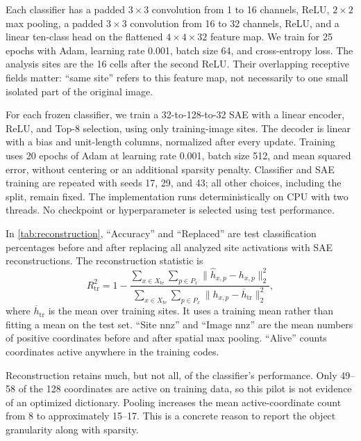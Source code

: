Each classifier has a padded $3\times3$ convolution from 1 to 16
channels, ReLU, $2\times2$ max pooling, a padded $3\times3$ convolution
from 16 to 32 channels, ReLU, and a linear ten-class head on the flattened
$4\times4\times32$ feature map. We train for 25 epochs with Adam,
learning rate 0.001, batch size 64, and cross-entropy loss. The analysis
sites are the 16 cells after the second ReLU. Their overlapping receptive
fields matter: ``same site'' refers to this feature map, not necessarily
to one small isolated part of the original image.

For each frozen classifier, we train a 32-to-128-to-32 SAE with a linear
encoder, ReLU, and Top-8 selection, using only training-image sites.
The decoder is linear with a bias and unit-length columns, normalized
after every update. Training uses 20 epochs of Adam at learning rate
0.001, batch size 512, and mean squared error, without centering or an
additional sparsity penalty. Classifier and SAE training are repeated
with seeds 17, 29, and 43; all other choices, including the split, remain
fixed. The implementation runs deterministically on CPU with two threads.
No checkpoint or hyperparameter is selected using test performance.



In \cref{tab:reconstruction}, ``Accuracy'' and ``Replaced'' are test
classification percentages before and after replacing all analyzed site
activations with SAE reconstructions. The reconstruction statistic is
\begin{equation}\label{eq:reconstruction-statistic}
      R^{2}_{\mathrm{tr}}=1-
      \frac{\sum_{x\in X_{\mathrm{te}}}\sum_{p\in P_{x}}
            \|\widehat h_{x,p}-h_{x,p}\|_{2}^{2}}
      {\sum_{x\in X_{\mathrm{te}}}\sum_{p\in P_{x}}
            \|h_{x,p}-\overline h_{\mathrm{tr}}\|_{2}^{2}},
\end{equation}
where $\overline h_{\mathrm{tr}}$ is the mean over training sites.
It uses a training mean rather than fitting a mean on the test set.
``Site nnz'' and ``Image nnz'' are the mean numbers of positive
coordinates before and after spatial max pooling. ``Alive'' counts
coordinates active anywhere in the training codes.

Reconstruction retains much, but not all, of the classifier's performance.
Only 49--58 of the 128 coordinates are active on training data, so this
pilot is not evidence of an optimized dictionary. Pooling increases the
mean active-coordinate count from 8 to approximately 15--17. This is a
concrete reason to report the object granularity along with sparsity.

